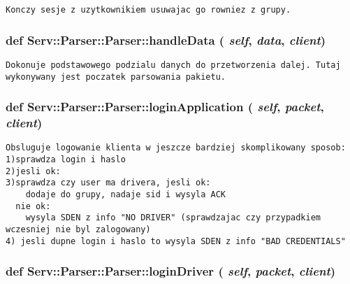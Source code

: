 \footnotesize\begin{verbatim}Konczy sesje z uzytkownikiem usuwajac go rowniez z grupy.\end{verbatim}
\normalsize
 \hypertarget{class_serv_1_1_parser_1_1_parser_060ed5ba3cbf55b63ecc3f3aa006da04}{
\subsubsection[{handleData}]{\setlength{\rightskip}{0pt plus 5cm}def Serv::Parser::Parser::handleData ( {\em self}, \/   {\em data}, \/   {\em client})}}
\label{class_serv_1_1_parser_1_1_parser_060ed5ba3cbf55b63ecc3f3aa006da04}




\footnotesize\begin{verbatim}Dokonuje podstawowego podzialu danych do przetworzenia dalej. Tutaj wykonywany jest poczatek parsowania pakietu.\end{verbatim}
\normalsize
 \hypertarget{class_serv_1_1_parser_1_1_parser_ec3286787a7c8642127416c77e1c2c8f}{
\subsubsection[{loginApplication}]{\setlength{\rightskip}{0pt plus 5cm}def Serv::Parser::Parser::loginApplication ( {\em self}, \/   {\em packet}, \/   {\em client})}}
\label{class_serv_1_1_parser_1_1_parser_ec3286787a7c8642127416c77e1c2c8f}




\footnotesize\begin{verbatim}Obsluguje logowanie klienta w jeszcze bardziej skomplikowany sposob:
1)sprawdza login i haslo
2)jesli ok:
3)sprawdza czy user ma drivera, jesli ok:
    dodaje do grupy, nadaje sid i wysyla ACK
  nie ok:
    wysyla SDEN z info "NO DRIVER" (sprawdzajac czy przypadkiem wczesniej nie byl zalogowany)
4) jesli dupne login i haslo to wysyla SDEN z info "BAD CREDENTIALS"        
\end{verbatim}
\normalsize
 \hypertarget{class_serv_1_1_parser_1_1_parser_e092cef5abd35ec04fa61e71377e1303}{
\subsubsection[{loginDriver}]{\setlength{\rightskip}{0pt plus 5cm}def Serv::Parser::Parser::loginDriver ( {\em self}, \/   {\em packet}, \/   {\em client})}}
\label{class_serv_1_1_parser_1_1_parser_e092cef5abd35ec04fa61e71377e1303}




